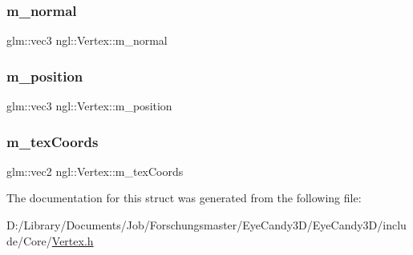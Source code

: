 \subsubsection{\texorpdfstring{m\+\_\+normal}{m\_normal}}
{\footnotesize\ttfamily glm\+::vec3 ngl\+::\+Vertex\+::m\+\_\+normal}

\mbox{\label{structngl_1_1_vertex_a50eb7ca096a6a8653f5bf4165b0a2568}} 
\subsubsection{\texorpdfstring{m\+\_\+position}{m\_position}}
{\footnotesize\ttfamily glm\+::vec3 ngl\+::\+Vertex\+::m\+\_\+position}

\mbox{\label{structngl_1_1_vertex_a0c05548e427728cba5daf4f952ab90de}} 
\subsubsection{\texorpdfstring{m\+\_\+tex\+Coords}{m\_texCoords}}
{\footnotesize\ttfamily glm\+::vec2 ngl\+::\+Vertex\+::m\+\_\+tex\+Coords}



The documentation for this struct was generated from the following file\+:\begin{DoxyCompactItemize}
\item 
D\+:/\+Library/\+Documents/\+Job/\+Forschungsmaster/\+Eye\+Candy3\+D/\+Eye\+Candy3\+D/include/\+Core/\mbox{\hyperlink{_vertex_8h}{Vertex.\+h}}\end{DoxyCompactItemize}
